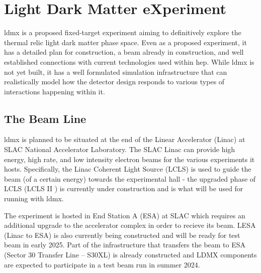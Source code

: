 \chapter{Light Dark Matter eXperiment}
\label{chapter:ldmx:experiment}


\ac{ldmx} is a proposed fixed-target experiment aiming to definitively explore
the thermal relic light dark matter phase space. Even as a proposed experiment, it has a detailed
plan for construction, a beam already in construction, and well established connections
with current technologies used within \ac{hep}. While \ac{ldmx} is not yet built,
it has a well formulated simulation infrastructure that can realistically model
how the detector design responds to various types of interactions happening within it.

\section{The Beam Line}
\ac{ldmx} is planned to be situated at the end of the Linear Accelerator (Linac) at SLAC National Accelerator
Laboratory. The SLAC Linac can provide high energy, high rate, and low intensity electron beams for
the various experiments it hosts. Specifically, the Linac Coherent Light Source (LCLS) is
used to guide the beam (of a certain energy) towards the experimental hall - the upgraded
phase of LCLS (LCLS II \cite{lcls-ii}) is currently under construction and is what will
be used for running with \ac{ldmx}.

The experiment is hosted in End Station A (ESA) at SLAC which requires an additional upgrade to the
accelerator complex in order to recieve its beam. LESA (Linac to ESA) \cite{lesa-design} is also currently being
constructed and will be ready for test beam in early 2025. Part of the infrastructure that
transfers the beam to ESA (Sector 30 Transfer Line -- S30XL) is already constructed and LDMX
components are expected to participate in a test beam run in summer 2024.

